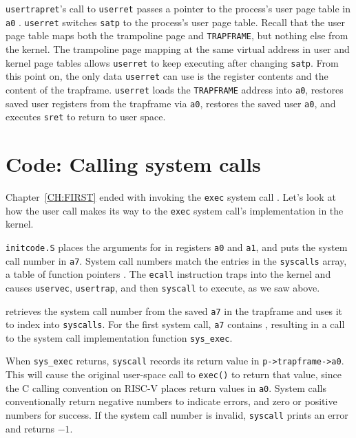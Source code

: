{\tt usertrapret}'s call to {\tt userret} passes 
a pointer to the process's user page table in {\tt a0}
.
{\tt userret} switches {\tt satp} to the process's user page table.
Recall that the user page table maps both the trampoline page
and {\tt TRAPFRAME}, but nothing else from the kernel.
The trampoline page mapping at the same
virtual address in user and kernel page tables allows
{\tt userret} to keep executing after changing {\tt satp}.
From this point on, the only data {\tt userret} can use is
the register contents and the content of the trapframe.
{\tt userret} loads the {\tt TRAPFRAME} address into {\tt a0},
restores saved user registers from the trapframe via {\tt a0},
restores the saved user {\tt a0},
and executes {\tt sret} to return to user space.

\section{Code: Calling system calls}

Chapter~\ref{CH:FIRST} ended with 
invoking the {\tt exec} system call
.
Let's look at how the user call
makes its way to the {\tt exec} system call's
implementation in the kernel.

{\tt initcode.S}
places the arguments for
in registers {\tt a0} and {\tt a1}, and puts the
system call number in
\texttt{a7}.
System call numbers match the entries in the {\tt syscalls} array,
a table of function pointers
.
The \lstinline{ecall} instruction traps into the kernel
and causes
{\tt uservec},
{\tt usertrap}, and then {\tt syscall} to execute, as we saw above.

retrieves the system call number from the saved
\texttt{a7} in the trapframe
and uses it to index into {\tt syscalls}.
For the first system call, 
\texttt{a7}
contains 
,
resulting in a call to the system call implementation function
\lstinline{sys_exec}.

When \lstinline{sys_exec} returns,
\lstinline{syscall}
records its return value in
\lstinline{p->trapframe->a0}.
This will cause the original user-space call to 
{\tt exec()} to return that value, since the C
calling convention on RISC-V places return values in {\tt a0}.
System calls conventionally return negative numbers to indicate
errors, and zero or positive numbers for success.
If the system call number is invalid,
\lstinline{syscall}
prints an error and returns $-1$.

